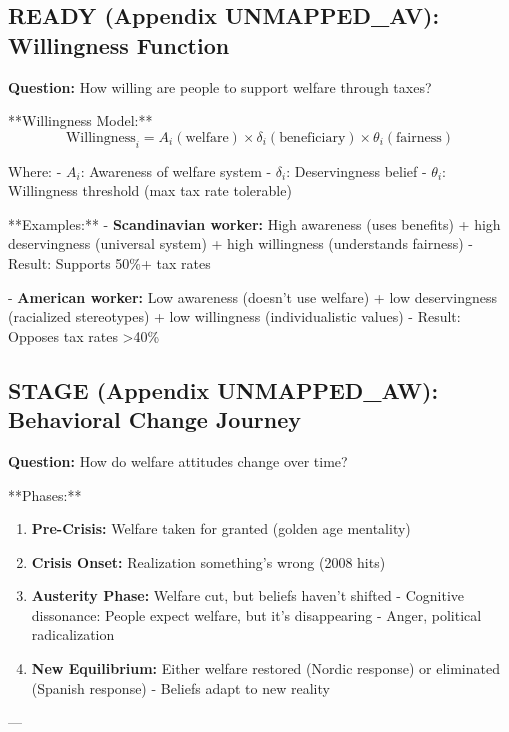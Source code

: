 \subsection{READY (Appendix UNMAPPED_AV): Willingness Function}

\textbf{Question:} How willing are people to support welfare through taxes?

**Willingness Model:**
\begin{equation}
\text{Willingness}_i = A_i(\text{welfare}) \times \delta_i(\text{beneficiary}) \times \theta_i(\text{fairness})
\end{equation}

Where:
- $A_i$: Awareness of welfare system
- $\delta_i$: Deservingness belief
- $\theta_i$: Willingness threshold (max tax rate tolerable)

**Examples:**
- \textbf{Scandinavian worker:} High awareness (uses benefits) + high deservingness (universal system) + high willingness (understands fairness)
   - Result: Supports 50\%+ tax rates

- \textbf{American worker:} Low awareness (doesn't use welfare) + low deservingness (racialized stereotypes) + low willingness (individualistic values)
   - Result: Opposes tax rates >40\%

\subsection{STAGE (Appendix UNMAPPED_AW): Behavioral Change Journey}

\textbf{Question:} How do welfare attitudes change over time?

**Phases:**
\begin{enumerate}
\item \textbf{Pre-Crisis:} Welfare taken for granted (golden age mentality)
\item \textbf{Crisis Onset:} Realization something's wrong (2008 hits)
\item \textbf{Austerity Phase:} Welfare cut, but beliefs haven't shifted
   - Cognitive dissonance: People expect welfare, but it's disappearing
   - Anger, political radicalization
\item \textbf{New Equilibrium:} Either welfare restored (Nordic response) or eliminated (Spanish response)
   - Beliefs adapt to new reality
\end{enumerate}

---

\clearpage


